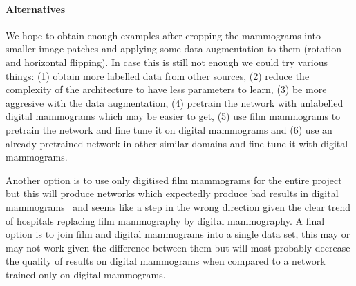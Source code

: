 \documentclass[11pt]{article}
\begin{document}
\paragraph{Alternatives}
We hope to obtain enough examples after cropping the mammograms into smaller image patches and applying some data augmentation to them (rotation and horizontal flipping). In case this is still not enough we could try various things: (1) obtain more labelled data from other sources, (2) reduce the complexity of the architecture to have less parameters to learn, (3) be more aggresive with the data augmentation, (4) pretrain the network with unlabelled digital mammograms which may be easier to get, (5) use film mammograms to pretrain the network and fine tune it on digital mammograms and (6) use an already pretrained network in other similar domains and fine tune it with digital mammograms.

Another option is to use only digitised film mammograms for the entire project but this will produce networks which expectedly produce bad results in digital mammograms~\cite{Zheng2012} and seems like a step in the wrong direction given the clear trend of hospitals replacing film mammography by digital mammography. A final option is to join film and digital mammograms into a single data set, this may or may not work given the difference between them but will most probably decrease the quality of results on digital mammograms when compared to a network trained only on digital mammograms.

\begin{comment}
Film Mammograms 
MIAS, DDSM, BancoWeb, CALMA, AMDI, B-screen, MiRAcle, BCDR-FM
inBeast paper has a good summary.

Digital 
INBreast, MIDAS (no labels), BCDR-DM

Clinical features: age, breast density, and family breast cancer history. 

Zheng2012 also says that "direct application of an SFM image-based CAD scheme to the FFDM images resulted in the substantial degradation of performance" "digitised image-based CAD can be converted for FFDMs while performing at a comparable, or better, level" "This is largely due to better contrast resolution, detection quantum efficiency and system linearity." He means converted as in retrained, though. (the ANN is completely retrained but it has little params)

Benchmarking datasets:
Moura, D.C., Loṕez, M.A.G., Cunha, P., De Posada, N.G., Pollan, R.R., Ramos, I., Loureiro, J.P., Moreira, I.C., De Araújo, B.M.F., Fernandes, T.C. Benchmarking datasets for breast cancer computer-aided diagnosis (CADx) (2013) Lecture Notes in Computer Science (including subseries Lecture Notes in Artificial Intelligence and Lecture Notes in Bioinformatics), 8258 LNCS (PART 1), pp. 326-333. 
show that 'this combination of clinical data and image descriptors is advantageous in most CADx scenarios.'
\end{comment}
\end{document}
